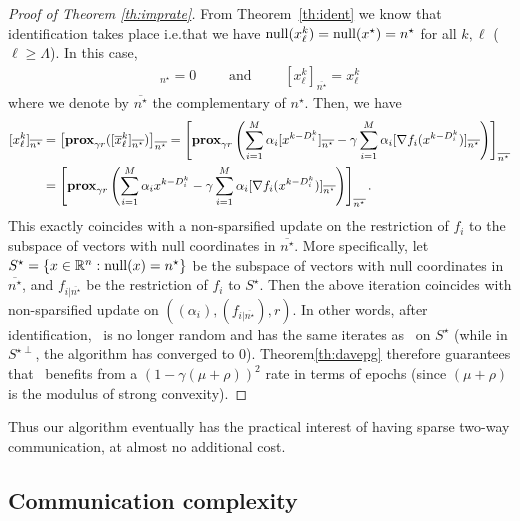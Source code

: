 \begin{proof}[Proof of Theorem \ref{th:imprate}]
From Theorem~\ref{th:ident} we know that identification takes place i.e.\;that we have $\mathrm{null}(x^{k}_{\ell}) = \mathrm{null}(x^{\star}) = n^{\star}$ for all $k,\ell$ ($\ell\geq\Lambda$).
In this case, 
\begin{align*}
    [x^k_{\ell}]_{n^{\star}} = 0 \qquad\text{ and }\qquad[x^k_{\ell}]_{\overline{n^{\star}}} = x_{\ell}^k
\end{align*}
where we denote by $\overline{n^{\star}}$ the complementary of $n^{\star}$. Then, we have
\begin{align*}
  \nonumber   [x^k_\ell]_{\overline{n^\star}}  
  &=\left[\mathbf{prox}_{\gamma r}([\overline{x}^k_\ell]_{\overline{n^\star}})\right]_{\overline{n^\star}}  
  = \left[\mathbf{prox}_{\gamma r}\left(\sum_{i=1}^M \alpha_i [x^{k-D_i^k}]_{\overline{n^\star}} - \gamma \sum_{i=1}^M \alpha_i [\nabla f_i(x^{k-D_i^k})]_{\overline{n^\star}} \right)\right]_{\overline{n^\star}} \\
     &=  \left[\mathbf{prox}_{\gamma r}\left(\sum_{i=1}^M \alpha_i x^{k-D_i^k} - \gamma \sum_{i=1}^M \alpha_i [\nabla f_i(x^{k-D_i^k})]_{\overline{n^\star}} \right)\right]_{\overline{n^\star}}.
\end{align*}
This exactly coincides with a non-sparsified update on the restriction of $f_i$ to the subspace of vectors with null coordinates in ${\overline{n^\star}}$. More specifically, let $S^\star = \{ x\in \mathbb{R}^n : \mathrm{null}(x) = n^\star \}$ be the subspace of vectors with null coordinates in ${\overline{n^\star}}$, and
$f_{i|{\overline{n^\star}}}$ be the restriction of $f_i$ to $S^\star$.
Then the above iteration coincides with non-sparsified update on
$((\alpha_i),(f_{i|{\overline{n^\star}}}),r)$. In other words, after identification, \spyI~is no longer random and has the same iterates as \dave~on $S^\star$ (while in $S^{\star\perp}$, the algorithm has converged to $0$). Theorem\;\ref{th:davepg} therefore guarantees that \spyI~benefits from a $(1-\gamma (\mu+\rho))^2$ rate in terms of epochs (since $(\mu+\rho)$ is the modulus of strong convexity).

\end{proof}

Thus our algorithm eventually has the practical interest of having sparse two-way communication, at almost no additional cost.

\subsection{Communication complexity}\label{sec:comm}

